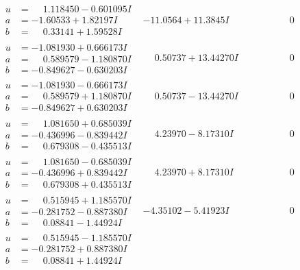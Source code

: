 \documentclass[1p]{elsarticle_modified}
\theoremstyle{definition}
\begin{document}
$$\begin{array}{c|c|c}
\begin{aligned}
u &= \phantom{-}1.118450 - 0.601095 I \\
a &= -1.60533 + 1.82197 I \\
b &= \phantom{-}0.33141 + 1.59528 I\end{aligned}
 & -11.0564 + 11.3845 I & \phantom{-0.000000 } 0 \\ \hline\begin{aligned}
u &= -1.081930 + 0.666173 I \\
a &= \phantom{-}0.589579 - 1.180870 I \\
b &= -0.849627 - 0.630203 I\end{aligned}
 & \phantom{-}0.50737 + 13.44270 I & \phantom{-0.000000 } 0 \\ \hline\begin{aligned}
u &= -1.081930 - 0.666173 I \\
a &= \phantom{-}0.589579 + 1.180870 I \\
b &= -0.849627 + 0.630203 I\end{aligned}
 & \phantom{-}0.50737 - 13.44270 I & \phantom{-0.000000 } 0 \\ \hline\begin{aligned}
u &= \phantom{-}1.081650 + 0.685039 I \\
a &= -0.436996 - 0.839442 I \\
b &= \phantom{-}0.679308 - 0.435513 I\end{aligned}
 & \phantom{-}4.23970 - 8.17310 I & \phantom{-0.000000 } 0 \\ \hline\begin{aligned}
u &= \phantom{-}1.081650 - 0.685039 I \\
a &= -0.436996 + 0.839442 I \\
b &= \phantom{-}0.679308 + 0.435513 I\end{aligned}
 & \phantom{-}4.23970 + 8.17310 I & \phantom{-0.000000 } 0 \\ \hline\begin{aligned}
u &= \phantom{-}0.515945 + 1.185570 I \\
a &= -0.281752 - 0.887380 I \\
b &= \phantom{-}0.08841 - 1.44924 I\end{aligned}
 & -4.35102 - 5.41923 I & \phantom{-0.000000 } 0 \\ \hline\begin{aligned}
u &= \phantom{-}0.515945 - 1.185570 I \\
a &= -0.281752 + 0.887380 I \\
b &= \phantom{-}0.08841 + 1.44924 I\end{aligned}

\end{array}$$
\end{document}
